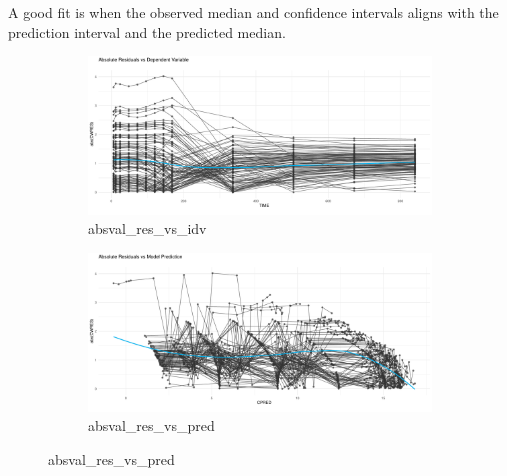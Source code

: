 A good fit is when the observed median and confidence intervals aligns with the prediction interval and the predicted median. 

\begin{figure}[htbp]
    \centering
    \begin{subfigure}[b]{0.45\linewidth}
        \centering
        \includegraphics[width=\linewidth]{fig/img/Xpose/absval_res_vs_idv.pdf}
        \caption{absval\_res\_vs\_idv}
        \label{fig:absval_res_vs_idv}
    \end{subfigure}
    \hfill
    \begin{subfigure}[b]{0.45\linewidth}
        \centering
        \includegraphics[width=\linewidth]{fig/img/Xpose/absval_res_vs_pred.pdf}
        \caption{absval\_res\_vs\_pred}
        \label{fig:absval_res_vs_pred}
    \end{subfigure}
    
    \vspace{1em} %


\end{figure}
